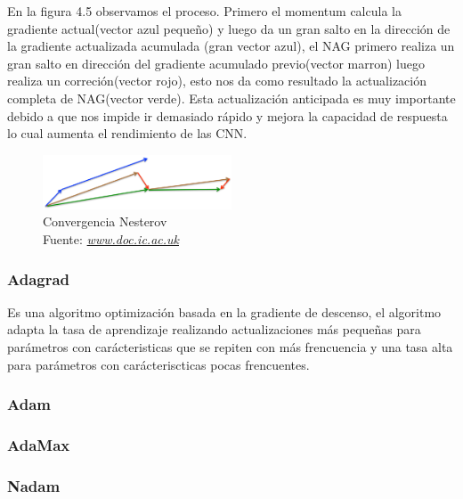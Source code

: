En la figura 4.5 observamos el proceso. Primero el momentum calcula  la gradiente actual(vector azul pequeño)  y luego da un gran salto en la dirección de la gradiente actualizada acumulada (gran vector azul), el NAG primero realiza un gran salto en dirección del gradiente acumulado previo(vector marron) luego realiza un correción(vector rojo), esto nos da como resultado la actualización completa de NAG(vector verde). Esta actualización anticipada es muy importante debido a que nos impide ir demasiado rápido y mejora la capacidad de respuesta lo cual aumenta el rendimiento de las CNN.
\begin{figure}[H]
	\centering
	\includegraphics[width=0.5\textwidth]{Figures/nesterov.png}
	\caption{Convergencia Nesterov\\ Fuente:  \href{https://www.doc.ic.ac.uk/~js4416/163/website/neural-networks/optimisers.html}{\textit{www.doc.ic.ac.uk}}}
	\label{nesterov }
\end{figure}
\subsubsection{Adagrad}
Es una algoritmo optimización basada en la gradiente de descenso, el algoritmo adapta la tasa de aprendizaje  realizando actualizaciones más pequeñas para parámetros con carácteristicas que se repiten con más frencuencia y una tasa alta  para parámetros con carácteriscticas pocas frencuentes.
\subsubsection{Adam	}
\subsubsection{AdaMax}
\subsubsection{Nadam}